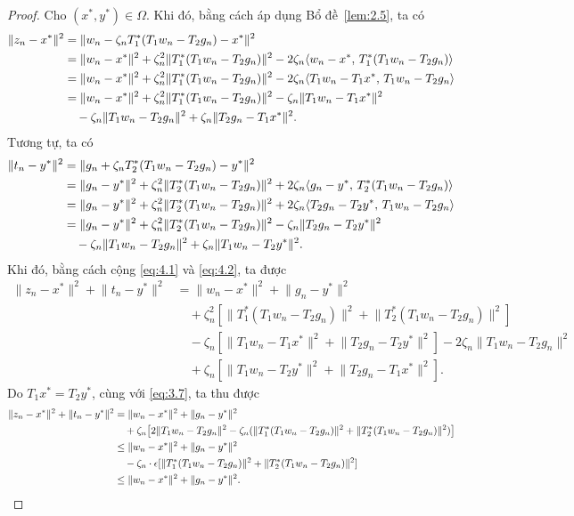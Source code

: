 \documentclass{MyBook}
\theoremstyle{plain}
\theoremstyle{definition}
\theoremstyle{remark}
\numberwithin{equation}{chapter}
\newcommand{\inp}[2]{\langle #1,\,#2\rangle}
\newcommand{\nm}[1]{\lVert #1\rVert}
\begin{document}
\begin{proof}
Cho $(x^{*},y^{*})\in\Omega$. Khi đó, bằng cách áp dụng Bổ đề~\ref{lem:2.5}, ta có
\begin{align}
\nm{z_n-x^{*}}^2 &= \nm{w_n-\zeta_n T_1^{*}(T_1w_n-T_2g_n)-x^{*}}^2\notag\\
&= \nm{w_n-x^{*}}^2+\zeta_n^2\nm{T_1^{*}(T_1w_n-T_2g_n)}^2-2\zeta_n\inp{w_n-x^{*}}{T_1^{*}(T_1w_n-T_2g_n)}\notag\\
&= \nm{w_n-x^{*}}^2+\zeta_n^2\nm{T_1^{*}(T_1w_n-T_2g_n)}^2-2\zeta_n\inp{T_1w_n-T_1x^{*}}{T_1w_n-T_2g_n}\notag\\
&= \nm{w_n-x^{*}}^2+\zeta_n^2\nm{T_1^{*}(T_1w_n-T_2g_n)}^2-\zeta_n\nm{T_1w_n-T_1x^{*}}^2\notag\\
&\quad -\zeta_n\nm{T_1w_n-T_2g_n}^2+\zeta_n\nm{T_2g_n-T_1x^{*}}^2. \label{eq:4.1}
\end{align}
Tương tự, ta có
\begin{align}
\nm{t_n-y^{*}}^2 &= \nm{g_n+\zeta_n T_2^{*}(T_1w_n-T_2g_n)-y^{*}}^2\notag\\
&= \nm{g_n-y^{*}}^2+\zeta_n^2\nm{T_2^{*}(T_1w_n-T_2g_n)}^2+2\zeta_n\inp{g_n-y^{*}}{T_2^{*}(T_1w_n-T_2g_n)}\notag\\
&= \nm{g_n-y^{*}}^2+\zeta_n^2\nm{T_2^{*}(T_1w_n-T_2g_n)}^2+2\zeta_n\inp{T_2g_n-T_2y^{*}}{T_1w_n-T_2g_n}\notag\\
&= \nm{g_n-y^{*}}^2+\zeta_n^2\nm{T_2^{*}(T_1w_n-T_2g_n)}^2-\zeta_n\nm{T_2g_n-T_2y^{*}}^2\notag\\
&\quad -\zeta_n\nm{T_1w_n-T_2g_n}^2+\zeta_n\nm{T_1w_n-T_2y^{*}}^2. \label{eq:4.2}
\end{align}
Khi đó, bằng cách cộng \eqref{eq:4.1} và \eqref{eq:4.2}, ta được
\begin{align*}
\nm{z_n-x^{*}}^2+\nm{t_n-y^{*}}^2 &= \nm{w_n-x^{*}}^2+\nm{g_n-y^{*}}^2\\
&\quad +\zeta_n^2[\nm{T_1^{*}(T_1w_n-T_2g_n)}^2+\nm{T_2^{*}(T_1w_n-T_2g_n)}^2]\\
&\quad -\zeta_n[\nm{T_1w_n-T_1x^{*}}^2+\nm{T_2g_n-T_2y^{*}}^2]-2\zeta_n\nm{T_1w_n-T_2g_n}^2\\
&\quad +\zeta_n[\nm{T_1w_n-T_2y^{*}}^2+\nm{T_2g_n-T_1x^{*}}^2].
\end{align*}
Do $T_1x^{*}=T_2y^{*}$, cùng với \eqref{eq:3.7}, ta thu được
\begin{align}
\nm{z_n-x^{*}}^2+\nm{t_n-y^{*}}^2 &= \nm{w_n-x^{*}}^2+\nm{g_n-y^{*}}^2\notag\\
&\quad +\zeta_n\bigl[2\nm{T_1w_n-T_2g_n}^2-\zeta_n(\nm{T_1^{*}(T_1w_n-T_2g_n)}^2+\nm{T_2^{*}(T_1w_n-T_2g_n)}^2)\bigr]\notag\\
&\le \nm{w_n-x^{*}}^2+\nm{g_n-y^{*}}^2\notag\\
&\quad -\zeta_n\cdot\epsilon[\nm{T_1^{*}(T_1w_n-T_2g_n)}^2+\nm{T_2^{*}(T_1w_n-T_2g_n)}^2]\notag\\
&\le \nm{w_n-x^{*}}^2+\nm{g_n-y^{*}}^2. \label{eq:4.3}
\end{align}
\end{proof}
\end{document}
